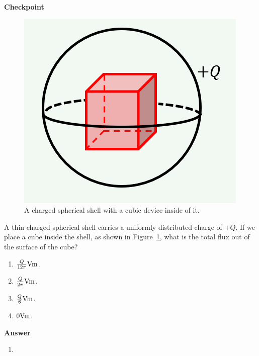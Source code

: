 \begin{framed}
\textbf{Checkpoint}\\
\begin{figure}[!htbp]
\centering
\includegraphics[width=0.3\linewidth]{files/spherecube-975b218a76380121f84eee937fcc1c53.png}
\caption[]{A charged spherical shell with a cubic device inside of it.}
\label{fig:gauss:spherecube}
\end{figure}

A thin charged spherical shell carries a uniformly distributed charge of $+Q$. If we place a cube inside the shell, as shown in Figure~\ref{fig:gauss:spherecube}, what is the total flux out of the surface of the cube?

\begin{enumerate}
\item $\frac{Q}{12\pi}{\rm Vm}$.
\item $\frac{Q}{2\pi} {\rm Vm}$.
\item $\frac{Q}{6} {\rm Vm}$.
\item $0 {\rm Vm}$.
\end{enumerate}

\begin{framed}
\textbf{Answer}\\
\begin{enumerate}[resume]
\item
\end{enumerate}
\end{framed}
\end{framed}

